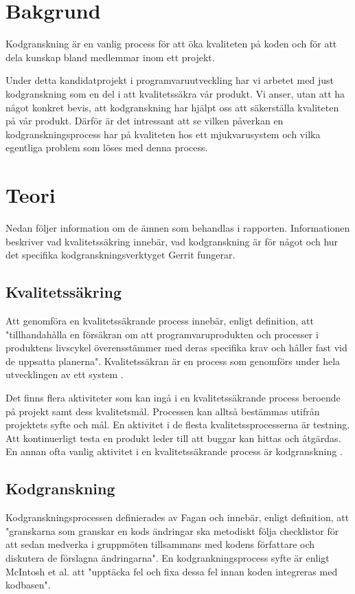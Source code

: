 \section{Bakgrund}
\label{sec:background-wallstrom}

Kodgranskning är en vanlig process för att öka kvaliteten på koden och för att dela kunskap bland medlemmar inom ett projekt.

Under detta kandidatprojekt i programvaruutveckling har vi arbetet med just kodgranskning som en del i att kvalitetssäkra vår produkt. Vi anser, utan att ha något konkret bevis, att kodgranskning har hjälpt oss att säkerställa kvaliteten på vår produkt. Därför är det intressant att se vilken påverkan en kodgranskningsprocess har på kvaliteten hos ett mjukvarusystem och vilka egentliga problem som löses med denna process.

\section{Teori}
\label{sec:theory-wallstrom}
Nedan följer information om de ämnen som behandlas i rapporten. Informationen beskriver vad kvalitetssäkring innebär, vad kodgranskning är för något och hur det specifika kodgranskningsverktyget Gerrit fungerar.

\subsection{Kvalitetssäkring}
Att genomföra en kvalitetssäkrande process innebär, enligt definition, att "tillhandahålla en försäkran om att programvaruprodukten och processer i produktens livscykel överensstämmer med deras specifika krav och håller fast vid de uppsatta planerna". 
Kvalitetssäkran är en process som genomförs under hela utvecklingen av ett system \cite{feldman2005quality}.

Det finns flera aktiviteter som kan ingå i en kvalitetssäkrande process beroende på projekt samt dess kvalitetsmål. Processen kan alltså bestämmas utifrån projektets syfte och mål. En aktivitet i de flesta kvalitetssprocesserna är testning. Att kontinuerligt testa en produkt leder till att buggar kan hittas och åtgärdas. En annan ofta vanlig aktivitet i en kvalitetssäkrande process är kodgranskning \cite{feldman2005quality}.

\subsection{Kodgranskning}
Kodgranskningsprocessen definierades av Fagan \cite{fagan1999design} och innebär, enligt definition, att "granskarna som granskar en kods ändringar ska metodiskt följa checklistor för att sedan medverka i gruppmöten tillsammans med kodens författare och diskutera de förslagna ändringarna". En kodgrankningsprocess syfte är enligt McIntosh et al. \cite{shimagaki2016study} att "upptäcka fel och fixa dessa fel innan koden integreras med kodbasen". 

